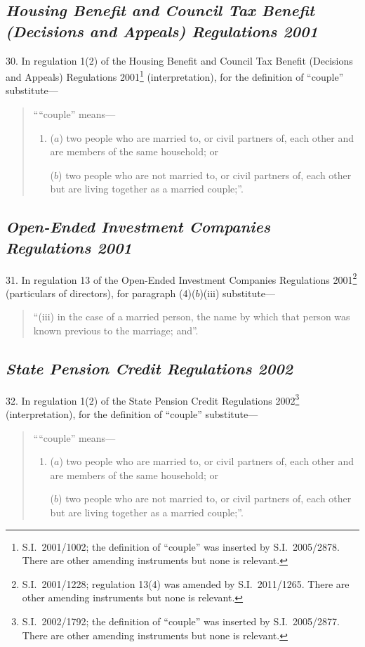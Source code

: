 \documentclass[12pt,a4paper]{article}
\begin{document}
\subsection*{\itshape Housing Benefit and Council Tax Benefit (Decisions and Appeals) Regulations 2001}

30.  In regulation 1(2) of the Housing Benefit and Council Tax Benefit (Decisions and Appeals) Regulations 2001\footnote{S.I.~2001/1002; the definition of “couple” was inserted by S.I.~2005/2878. There are other amending instruments but none is relevant.} (interpretation), for the definition of “couple” substitute—
\begin{quotation}
““couple” means—
\begin{enumerate}\item[]
($a$) 
two people who are married to, or civil partners of, each other and are members of the same household; or

($b$) 
two people who are not married to, or civil partners of, each other but are living together as a married couple;”.
\end{enumerate}
\end{quotation}

\subsection*{\itshape Open-Ended Investment Companies Regulations 2001}

31.  In regulation 13 of the Open-Ended Investment Companies Regulations 2001\footnote{S.I.~2001/1228; regulation 13(4) was amended by S.I.~2011/1265. There are other amending instruments but none is relevant.} (particulars of directors), for paragraph (4)($b$)(iii)  substitute—
\begin{quotation}
“(iii) in the case of a married person, the name by which that person was known previous to the marriage; and”.
\end{quotation}

\subsection*{\itshape State Pension Credit Regulations 2002}

32.  In regulation 1(2) of the State Pension Credit Regulations 2002\footnote{S.I.~2002/1792; the definition of “couple” was inserted by S.I.~2005/2877. There are other amending instruments but none is relevant.} (interpretation), for the definition of “couple” substitute—
\begin{quotation}
““couple” means—
\begin{enumerate}\item[]
($a$) 
two people who are married to, or civil partners of, each other and are members of the same household; or

($b$) 
two people who are not married to, or civil partners of, each other but are living together as a married couple;”.
\end{enumerate}
\end{quotation}
\end{document}
